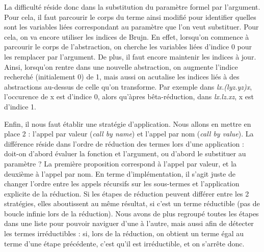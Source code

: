\documentclass[11pt,a4paper]{report}
\begin{document}
La difficulté réside donc dans la substitution du paramètre formel par l'argument. Pour cela, il faut parcourir le corps du terme ainsi modifié pour identifier quelles sont les variables liées correspondant au paramètre que l'on veut substituer. Pour cela, on va encore utiliser les indices de Brujn. En effet, lorsqu'on commence à parcourir le corps de l'abstraction, on cherche les variables liées d'indice 0 pour les remplacer par l'argument. De plus, il faut encore maintenir les indices à jour. Ainsi, lorsqu'on rentre dans une nouvelle abstraction, on augmente l'indice recherché (initialement 0) de 1, mais aussi on acutalise les indices liés à des abstractions au-dessus de celle qu'on transforme. Par exemple dans \textit{lx.(lyz.yz)x}, l'occurence de x est d'indice 0, alors qu'àpres bêta-réduction, dans \textit{lx.lz.xz}, x est d'indice 1.

\medskip

Enfin, il nous faut établir une stratégie d'application. Nous allons en mettre en place 2 : l'appel par valeur (\textit{call by name}) et l'appel par nom (\textit{call by value}). La différence réside dans l'ordre de réduction des termes lors d'une application : doit-on d'abord évaluer la fonction et l'argument, ou d'abord le substituer au paramètre ? La première proposition correspond à l'appel par valeur, et la deuxième à l'appel par nom. En terme d'implémentation, il s'agit juste de changer l'ordre entre les appels récursifs sur les sous-termes et l'application explicite de la réduction. Si les étapes de réduction peuvent différer entre les 2 stratégies, elles aboutissent au même résultat, si c'est un terme réductible (pas de boucle infinie lors de la réduction). Nous avons de plus regroupé toutes les étapes dans une liste pour pouvoir naviguer d'une à l'autre, mais aussi afin de détecter les termes irréductibles : si, lors de la réduction, on obtient un terme égal au terme d'une étape précédente, c'est qu'il est irréductible, et on s'arrête donc.
\end{document}

